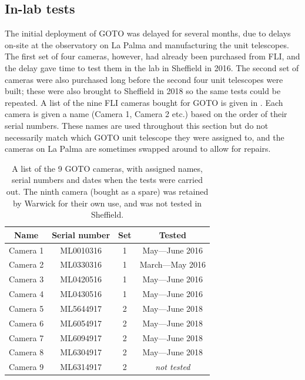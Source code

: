 
\subsection{In-lab tests}
\label{sec:camera_tests}
\begin{colsection}

The initial deployment of GOTO was delayed for several months, due to delays on-site at the observatory on La Palma and manufacturing the unit telescopes. The first set of four cameras, however, had already been purchased from FLI, and the delay gave time to test them in the lab in Sheffield in 2016. The second set of cameras were also purchased long before the second four unit telescopes were built; these were also brought to Sheffield  in 2018 so the same tests could be repeated. A list of the nine FLI cameras bought for GOTO is given in . Each camera is given a name (Camera 1, Camera 2 etc.) based on the order of their serial numbers. These names are used throughout this section but do not necessarily match which GOTO unit telescope they were assigned to, and the cameras on La Palma are sometimes swapped around to allow for repairs.

\begin{table}[t]
    \begin{center}
        \begin{tabular}{c|ccc} %
            Name     & Serial number & Set & Tested \\
            \midrule
            Camera 1 & ML0010316     &   1 & May---June 2016     \\
            Camera 2 & ML0330316     &   1 & March---May 2016    \\
            Camera 3 & ML0420516     &   1 & May---June 2016     \\
            Camera 4 & ML0430516     &   1 & May---June 2016     \\
            Camera 5 & ML5644917     &   2 & May---June 2018     \\
            Camera 6 & ML6054917     &   2 & May---June 2018     \\
            Camera 7 & ML6094917     &   2 & May---June 2018     \\
            Camera 8 & ML6304917     &   2 & May---June 2018     \\
            Camera 9 & ML6314917     &   2 & \textit{not tested} \\
        \end{tabular}
    \end{center}
    \caption[List of GOTO cameras]{
        A list of the 9 GOTO cameras, with assigned names, serial numbers and dates when the tests were carried out. The ninth camera (bought as a spare) was retained by Warwick for their own use, and was not tested in Sheffield.
    }\label{tab:cameras}
\end{table}


\end{colsection}
